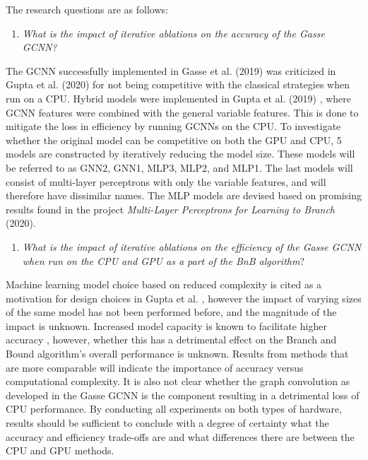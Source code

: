 The research questions are as follows:
%
\begin{enumerate}[label=(\roman*)]
    \item \textit{What is the impact of iterative ablations on the accuracy of the Gasse \gls{GCNN}?}
\end{enumerate}
%
The \gls{GCNN} successfully implemented in Gasse et al. (2019) \cite{gasse2019exact} was criticized in Gupta et al. (2020) for not being competitive with the classical strategies when run on a \gls{CPU}.
Hybrid models were implemented in Gupta et al. (2019) \cite{gupta2020hybrid}, where \Gls{GCNN} features were combined with the general variable features. This is done to mitigate the loss in efficiency by running \gls{GCNN}s on the \gls{CPU}. To investigate whether the original model can be competitive on both the \gls{GPU} and \gls{CPU}, 5 models are constructed by iteratively reducing the model size. These models will be referred to as GNN2, GNN1, MLP3, MLP2, and MLP1. The last models will consist of multi-layer perceptrons with only the variable features, and will therefore have dissimilar names. The \gls{MLP} models are devised based on promising results found in the project \textit{Multi-Layer Perceptrons for Learning to Branch
} (2020).
%
\begin{enumerate}[resume*]
    \item \textit{What is the impact of iterative ablations on the efficiency of the Gasse \gls{GCNN} when run on the \gls{CPU} and \gls{GPU} as a part of the \gls{BnB} algorithm}?
\end{enumerate}
%
Machine learning model choice based on reduced complexity is cited as a motivation for design choices in Gupta et al. \cite{gupta2020hybrid}, however the impact of varying sizes of the same model has not been performed before, and the magnitude of the impact is unknown. Increased model capacity is known to facilitate higher accuracy \cite{goodfellow2016deep}, however, whether this has a detrimental effect on the Branch and Bound algorithm's overall performance is unknown. Results from methods that are more comparable will indicate the importance of accuracy versus computational complexity. It is also not clear whether the graph convolution as developed in the Gasse \gls{GCNN} is the component resulting in a detrimental loss of \gls{CPU} performance. By conducting all experiments on both types of hardware, results should be sufficient to conclude with a degree of certainty what the accuracy and efficiency trade-offs are and what differences there are between the \gls{CPU} and \gls{GPU} methods. 
